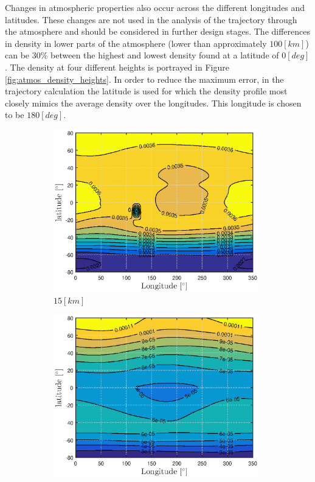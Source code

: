 Changes in atmospheric properties also occur across the different longitudes and latitudes. These changes are not used in the analysis of the trajectory through the atmosphere and should be considered in further design stages. The differences in density in lower parts of the atmosphere (lower than approximately $100 \left[km\right]$) can be $30\%$ between the highest and lowest density found at a latitude of $0 \left[deg\right]$. The density at four different heights is portrayed in Figure \ref{fig:atmos_density_heights}. In order to reduce the maximum error, in the trajectory calculation the latitude is used for which the density profile most closely mimics the average density over the longitudes. This longitude is chosen to be $180 \left[deg\right]$.

\begin{figure}[h]
	\centering
	\begin{subfigure}{0.49\textwidth}
		\centering
		\includegraphics[width=0.98\textwidth]{Figure/Atmosphere/density_15km.eps}
		\caption{$15 \left[km\right]$} 
		\label{fig:atmos_rho_15km}
	\end{subfigure}
	\begin{subfigure}{0.49\textwidth}
		\centering
		\includegraphics[width=0.98\textwidth]{Figure/Atmosphere/density_50km.eps}

\end{subfigure}
\end{figure}

